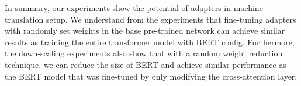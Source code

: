 In summary, our experiments show the potential of adapters in machine translation setup. We understand from the experiments that fine-tuning adapters with randomly set weights in the base pre-trained network can achieve similar results as training the entire transformer model with BERT config. Furthermore, the down-scaling experiments also show that with a random weight reduction technique, we can reduce the size of BERT and achieve similar performance as the BERT model that was fine-tuned by only modifying the cross-attention layer.